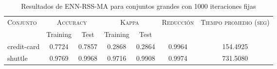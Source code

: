 \begin{table}[]
\centering
\begin{tabular}{l c c c c c c}
\hline
\multirow{2}{*}{\textsc{Conjunto}}
	& \multicolumn{2}{c}{\textsc{Accuracy}}
	& \multicolumn{2}{c}{\textsc{Kappa}}
	& \textsc{Reducción}
	& \textsc{Tiempo promedio (seg)} \\
	& Training & Test
	& Training & Test \\ 
\hline
\hline

credit-card & 0.7724 & 0.7857 & 0.2868 & 0.2864 & 0.9964 & 154.4925 \\
shuttle & 0.9769 & 0.9968 & 0.9716 & 0.9908 & 0.9974 & 731.5080 \\

\hline
\end{tabular}
\caption{Resultados de ENN-RSS-MA para conjuntos grandes con 1000 iteraciones fijas}
\label{res-grande-ENN-RSS-MA}
\end{table}

\clearpage

